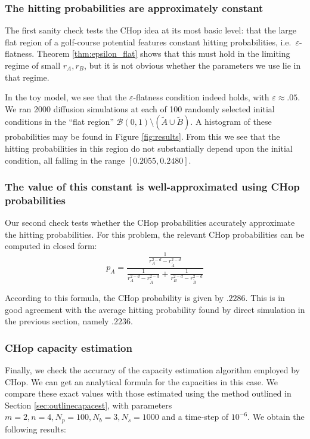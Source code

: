 \documentclass[english, aip, jcp, priprint, graphicx,floatfix]{revtex4-1}
\theoremstyle{plain}
\theoremstyle{definition}
\theoremstyle{plain}
\begin{document}
\subsubsection{The hitting probabilities are approximately constant}

The first sanity check tests the CHop idea at its most basic level: that the large flat region of a golf-course potential features constant hitting probabilities, i.e.\ $\varepsilon$-flatness.  Theorem \ref{thm:epsilon_flat} shows that this must hold in the limiting regime of small $r_A,r_B$, but it is not obvious whether the parameters we use lie in that regime.  

In the toy model, we see that the $\varepsilon$-flatness condition indeed holds, with $\varepsilon \approx .05$.  We ran 2000 diffusion simulations at each of 100 randomly selected initial conditions in the ``flat region'' $\mathcal{B}(0, 1) \setminus (\tilde{A} \cup \tilde{B})$.  A histogram of these probabilities may be found in Figure \ref{fig:results}.  From this we see that the hitting probabilities in this region do not substantially depend upon the initial condition, all falling in the range $[0.2055, 0.2480]$.


\subsubsection{The value of this constant is well-approximated using CHop probabilities}

Our second check tests whether the CHop probabilities accurately approximate the hitting probabilities.  For this problem, the relevant CHop probabilities can be computed in closed form:
\begin{equation}
p_A = \frac{\frac{1}{r_A^{2 - d} - r_{\tilde{A}}^{2 - d}}}{\frac{1}{r_A^{2 - d} - r_{\tilde{A}}^{2 - d}} + \frac{1}{r_B^{2 - d} - r_{\tilde{B}}^{2 - d}}}
\end{equation}

According to this formula, the CHop probability is given by $.2286$.  This is in good agreement with the average hitting probability found by direct simulation in the previous section, namely $.2236$.  


\subsubsection{CHop capacity estimation}

Finally, we check the accuracy of the capacity estimation algorithm employed by CHop.  We can get an analytical formula for the capacities in this case.  We compare these exact values with those estimated using the method outlined in Section \ref{sec:outlinecapacest}, with parameters $m = 2, n = 4, N_p = 100, N_b = 3,N_s = 1000$ and a time-step of $10^{-6}$.  We obtain the following results:
\end{document}
